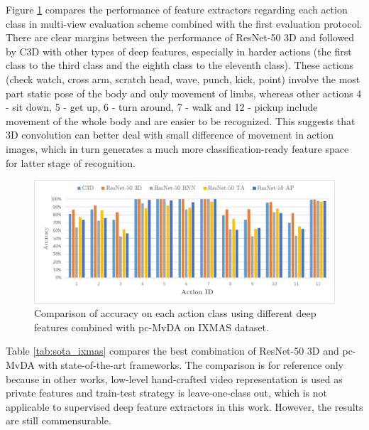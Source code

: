     Figure \ref{fig:pc-MvDA_confusion_ixmas} compares the performance of feature extractors regarding each action class in multi-view evaluation scheme combined with the first evaluation protocol. There are clear margins between the performance of ResNet-50 3D and followed by C3D with other types of deep features, especially in harder actions (the first class to the third class and the eighth class to the eleventh class). These actions (check watch, cross arm, scratch head, wave, punch, kick, point) involve the most part static pose of the body and only movement of limbs, whereas other actions 4 - sit down, 5 - get up, 6 - turn around, 7 - walk and 12 - pickup include movement of the whole body and are easier to be recognized. This suggests that 3D convolution can better deal with small difference of movement in action images, which in turn generates a much more classification-ready feature space for latter stage of recognition.

    \begin{figure}[htbp]
        \centering
        \includegraphics[width=0.8\linewidth]{figs/pc-MvDA_confusion_ixmas.png}
        \caption{Comparison of accuracy on each action class using different deep features combined with pc-MvDA on IXMAS dataset.}
        \label{fig:pc-MvDA_confusion_ixmas}
    \end{figure}

    Table \ref{tab:sota_ixmas} compares the best combination of ResNet-50 3D and pc-MvDA with state-of-the-art frameworks. The comparison is for reference only because in other works, low-level hand-crafted video representation is used as private features and train-test strategy is leave-one-class out, which is not applicable to supervised deep feature extractors in this work. However, the results are still commensurable. %

